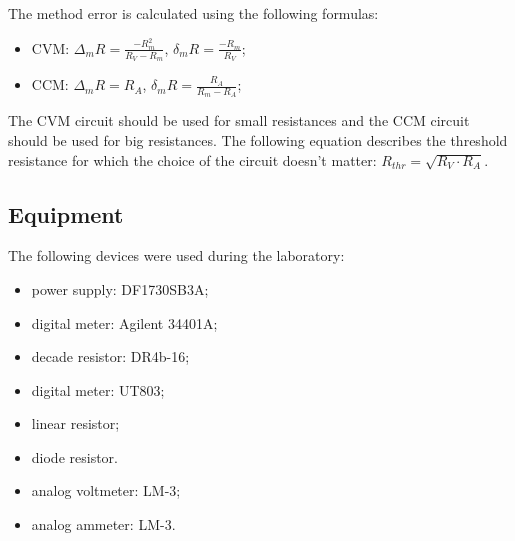 The method error is calculated using the following formulas:
\begin{itemize}
	\item CVM: $\Delta_m R = \frac{-R_m^2}{R_V - R_m}$, $\delta_m R = \frac{-R_m}{R_V}$;
	\item CCM: $\Delta_m R = R_A$, $\delta_m R = \frac{R_A}{R_m - R_A}$;
\end{itemize}

The CVM circuit should be used for small resistances and the CCM circuit should be used for big resistances. The following equation describes the threshold resistance for which the choice of the circuit doesn't matter: $R_{thr} = \sqrt{R_V\cdot R_A}$.


\subsection{Equipment}

The following devices were used during the laboratory:

\begin{itemize}
	\item power supply: DF1730SB3A;
	\item digital meter: Agilent 34401A;
	\item decade resistor: DR4b-16;
	\item digital meter: UT803;
	\item linear resistor;
	\item diode resistor.
	\item analog voltmeter: LM-3;
	\item analog ammeter: LM-3.
\end{itemize}
